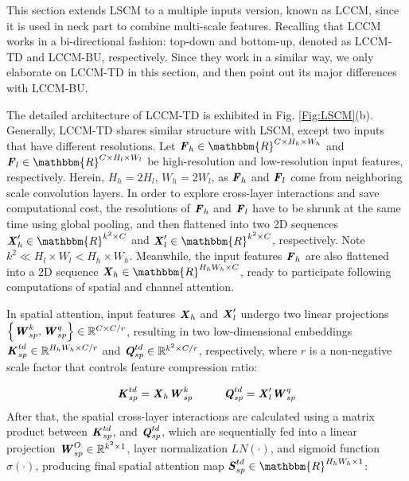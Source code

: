 \documentclass[lettersize,journal]{IEEEtran}
\begin{document}
This section extends LSCM to a multiple inputs version, known as LCCM, since it is used in neck part to combine multi-scale features. Recalling that LCCM works in a bi-directional fashion: top-down and bottom-up, denoted as LCCM-TD and LCCM-BU, respectively. Since they work in a similar way, we only elaborate on LCCM-TD in this section, and then point out its major differences with LCCM-BU.

The detailed architecture of LCCM-TD is exhibited in Fig. \ref{Fig:LSCM}(b). Generally, LCCM-TD shares similar structure with LSCM, except two inputs that have different resolutions. Let $\textbf{\emph{F}}_h\in\mathbbm{R}^{C\times H_h \times W_h}$ and $\textbf{\emph{F}}_l\in\mathbbm{R}^{C\times H_l \times W_l}$ be high-resolution and low-resolution input features, respectively. Herein, $H_h=2H_l$, $W_h=2W_l$, as $\textbf{\emph{F}}_h$ and $\textbf{\emph{F}}_l$ come from neighboring scale convolution layers. In order to explore cross-layer interactions and save computational cost, the resolutions of $\textbf{\emph{F}}_h$ and $\textbf{\emph{F}}_l$ have to be shrunk at the same time using global pooling, and then flattened into two 2D sequences $\textbf{\emph{X}}_h^{\prime}\in\mathbbm{R}^{k^{2}\times C}$ and $\textbf{\emph{X}}_l^{\prime}\in\mathbbm{R}^{k^{2}\times C}$, respectively. Note $k^2\ll H_l\times W_l<H_h\times W_h$. Meanwhile, the input features $\textbf{\emph{F}}_h$ are also flattened into a 2D sequence $\textbf{\emph{X}}_h\in\mathbbm{R}^{H_h W_h\times C}$, ready to participate following computations of spatial and channel attention.



In spatial attention, input features ${\textbf{\emph{X}}_{h}}$ and $\textbf{\emph{X}}_l^{\prime}$ undergo two linear projections $\left\{\textbf{\emph{W}}_{sp}^k, \textbf{\emph{W}}_{sp}^q\right\}\in\mathbb{R}^{C \times C/r}$, resulting in two low-dimensional embeddings ${{\textbf{\emph{K}}}_{sp}^{td}}\in\mathbb{R}^{H_hW_h\times C/r}$ and ${\textbf{\emph{Q}}}_{sp}^{td}\in\mathbb{R}^{k^{2} \times C/r}$, respectively, where $r$ is a non-negative scale factor that controls feature compression ratio:



\begin{equation}
	\textbf{\emph{K}}_{sp}^{td}= \textbf{\emph{X}}_{h} \textbf{\emph{W}}_{sp}^k \hspace{1cm} {\textbf{\emph{Q}}}_{sp}^{td}  = \textbf{\emph{X}}_{l}^{\prime}\textbf{\emph{W}}_{sp}^q 
\end{equation}
After that, the spatial cross-layer interactions are calculated using a matrix product between $\textbf{\emph{K}}_{sp}^{td}$, and $\textbf{\emph{Q}}_{sp}^{td}$, which are sequentially fed into a linear projection $\textbf{\emph{W}}_{sp}^O\in\mathbb{R}^{k^{2} \times 1}$, layer normalization $LN(\cdot)$, and sigmoid function $\sigma(\cdot)$, producing final spatial attention map $\textbf{\emph{S}}_{sp}^{td}\in\mathbbm{R}^{H_hW_h \times 1}$:
\end{document}
